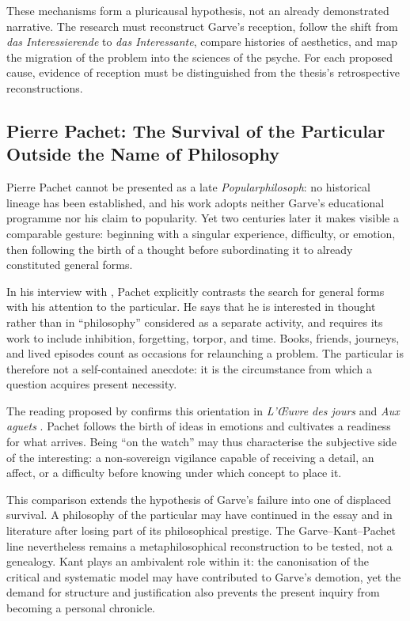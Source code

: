 \documentclass[11pt,a4paper]{article}
\begin{document}
These mechanisms form a pluricausal hypothesis, not an already demonstrated
narrative. The research must reconstruct Garve's reception, follow the shift
from \emph{das Interessierende} to \emph{das Interessante}, compare histories of
aesthetics, and map the migration of the problem into the sciences of the
psyche. For each proposed cause, evidence of reception must be distinguished
from the thesis's retrospective reconstructions.

\subsection{Pierre Pachet: The Survival of the Particular Outside the Name of Philosophy}

Pierre Pachet cannot be presented as a late \emph{Popularphilosoph}: no
historical lineage has been established, and his work adopts neither Garve's
educational programme nor his claim to popularity. Yet two centuries later it
makes visible a comparable gesture: beginning with a singular experience,
difficulty, or emotion, then following the birth of a thought before
subordinating it to already constituted general forms.

In his interview with \textcite{salgas1991pachet}, Pachet explicitly contrasts
the search for general forms with his attention to the particular. He says that
he is interested in thought rather than in ``philosophy'' considered as a
separate activity, and requires its work to include inhibition, forgetting,
torpor, and time. Books, friends, journeys, and lived episodes count as occasions
for relaunching a problem. The particular is therefore not a self-contained
anecdote: it is the circumstance from which a question acquires present
necessity.

The reading proposed by \textcite{rueff2016promontoire} confirms this orientation
in \emph{L'Œuvre des jours} and \emph{Aux aguets}
\parencite{pachet1999oeuvre,pachet2002aguets}. Pachet follows the birth of ideas
in emotions and cultivates a readiness for what arrives. Being ``on the watch''
may thus characterise the subjective side of the interesting: a non-sovereign
vigilance capable of receiving a detail, an affect, or a difficulty before
knowing under which concept to place it.

This comparison extends the hypothesis of Garve's failure into one of displaced
survival. A philosophy of the particular may have continued in the essay and in
literature after losing part of its philosophical prestige. The
Garve--Kant--Pachet line nevertheless remains a metaphilosophical reconstruction
to be tested, not a genealogy. Kant plays an ambivalent role within it: the
canonisation of the critical and systematic model may have contributed to
Garve's demotion, yet the demand for structure and justification also prevents
the present inquiry from becoming a personal chronicle.
\end{document}
